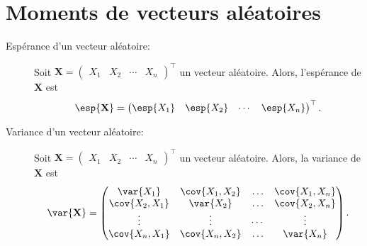 \section{Moments de vecteurs aléatoires}

\begin{description}
\item[Espérance d'un vecteur aléatoire:] Soit $\mathbf{X}=\begin{pmatrix}X_1& X_2 & \cdots & X_n\end{pmatrix}^{\top}$ un vecteur aléatoire. Alors, l'espérance de $\mathbf{X}$ est 
$$
\esp{\mathbf{X}}=\begin{pmatrix} \esp{X_1}& \esp{X_2} & \cdots & \esp{X_n}\end{pmatrix}^{\top}.
$$
\item[Variance d'un vecteur aléatoire:] Soit $\mathbf{X}=\begin{pmatrix}X_1& X_2 & \cdots & X_n\end{pmatrix}^{\top}$ un vecteur aléatoire. Alors, la variance de $\mathbf{X}$ est 
$$
\var{\mathbf{X}}=\begin{pmatrix} \var{X_1}& \cov{X_1,X_2} & \ldots & \cov{X_1,X_n} \\ \cov{X_2,X_1} & \var{X_2} & \ldots &  \cov{X_2,X_n} \\ \vdots & \vdots & \cdots & \vdots\\ \cov{X_n,X_1} & \cov{X_n,X_2}&\ldots&\var{X_n}\end{pmatrix}.
$$
\end{description}

